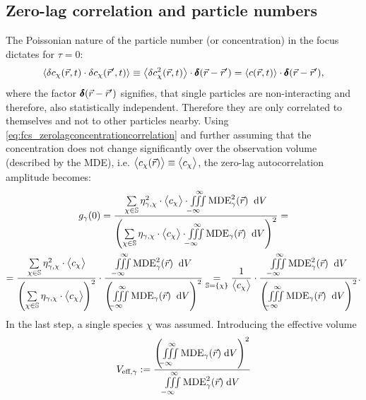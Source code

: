 \subsection{Zero-lag correlation and particle numbers}
\label{sec:ZeroLagCorrelationAndEffectiveVolume}
The Poissonian nature of the particle number (or concentration) in the focus dictates for $\tau=0$:
\begin{equation}\label{eq:fcs_zerolagconcentrationcorrelation}
  \left\langle \delta c_\chi(\vec{r},t)\cdot\delta c_\chi(\vec{r}',t)\right\rangle\equiv\left\langle \delta c_\chi^2(\vec{r},t)\right\rangle\cdot\pmb{\delta}(\vec{r}-\vec{r}')=\left\langle c(\vec{r},t)\right\rangle\cdot\pmb{\delta}(\vec{r}-\vec{r}'),
\end{equation}
where the factor $\pmb{\delta}(\vec{r}-\vec{r}')$ signifies, that single particles are non-interacting and therefore, also statistically independent. Therefore they are only correlated to themselves and not to other particles nearby. 
Using \eqref{eq:fcs_zerolagconcentrationcorrelation} and further assuming that the concentration does not change significantly over the observation volume (described by the MDE), i.e. $\bigl\langle c_\chi(\vec{r})\bigr\rangle\equiv\bigl\langle c_\chi\bigr\rangle$, the zero-lag autocorrelation amplitude becomes: %
\begin{multline}\label{eq:fcs_acffull_zerolag}
  g_\gamma(0)=\frac{\sum\limits_{\chi\in\mathbb{S}}\eta_{\gamma,\chi}^2\cdot\bigl\langle c_\chi\bigr\rangle\cdot \iiint\limits_{-\infty\ \ }^{\ \ \infty}\operatorname{MDE}_\gamma^2(\vec{r})\;\;\mathrm{d}V }{\left(\sum\limits_{\chi\in\mathbb{S}}\eta_{\gamma,\chi} \cdot\bigl\langle c_\chi\bigr\rangle\cdot\iiint\limits_{-\infty\ \ }^{\ \ \infty}\operatorname{MDE}_\gamma(\vec{r})\;\;\mathrm{d}V\right)^2}=\\
  =\frac{\sum\limits_{\chi\in\mathbb{S}}\eta_{\gamma,\chi}^2\cdot\bigl\langle c_\chi\bigr\rangle }{\left(\sum\limits_{\chi\in\mathbb{S}}\eta_{\gamma,\chi} \cdot\bigl\langle c_\chi\bigr\rangle\right)^2}\cdot\frac{\iiint\limits_{-\infty\ \ }^{\ \ \infty}\operatorname{MDE}_\gamma^2(\vec{r})\;\;\mathrm{d}V}{\left(\iiint\limits_{-\infty\ \ }^{\ \ \infty}\operatorname{MDE}_\gamma(\vec{r})\;\;\mathrm{d}V\right)^2}\underset{\mathbb{S}=\{\chi\}}{=} \frac{1 }{\bigl\langle c_\chi\bigr\rangle}\cdot\frac{\iiint\limits_{-\infty\ \ }^{\ \ \infty}\operatorname{MDE}_\gamma^2(\vec{r})\;\;\mathrm{d}V}{\left(\iiint\limits_{-\infty\ \ }^{\ \ \infty}\operatorname{MDE}_\gamma(\vec{r})\;\;\mathrm{d}V\right)^2}.
\end{multline}
In the last step, a single species $\chi$ was assumed. %
Introducing the effective volume %
\begin{equation}\label{eq:fcs_Veff}
  V_{{\text{eff}},\gamma}:=\frac{\left(\iiint\limits_{-\infty\ \ }^{\ \ \infty}\operatorname{MDE}_\gamma(\vec{r})\;\mathrm{d}V\right)^2}{\iiint\limits_{-\infty\ \ }^{\ \ \infty}\operatorname{MDE}_\gamma^2(\vec{r})\;\mathrm{d}V}
\end{equation}
